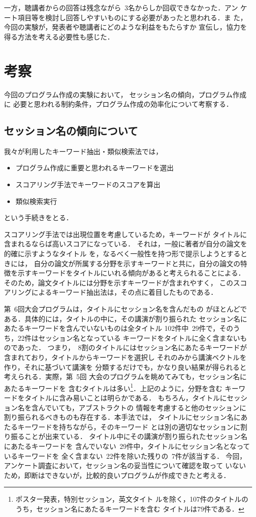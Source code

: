 一方，聴講者からの回答は残念ながら\ 3名からしか回収できなかった．アン
ケート項目等を検討し回答しやすいものにする必要があったと思われる．ま
た，今回の実験が，発表者や聴講者にどのような利益をもたらすか
宣伝し，協力を得る方法を考える必要性も感じた．

\section{考察} 
\label{mumu}
今回のプログラム作成の実験において，
セッション名の傾向，プログラム作成に
必要と思われる制約条件，プログラム作成の効率化について考察する．

\subsection{セッション名の傾向について}
我々が利用したキーワード抽出・類似検索法では，
\begin{itemize}
\item[1] プログラム作成に重要と思われるキーワードを選出
\item[2] スコアリング手法でキーワードのスコアを算出
\item[3] 類似検索実行
\end{itemize}
という手続きをとる．

スコアリング手法では出現位置を考慮しているため，キーワードが
タイトルに含まれるならば高いスコアになっている．
それは，一般に著者が自分の論文を的確に示すようなタイトル
を，なるべく一般性を持つ形で提示しようとするときには，
自分の論文が所属する分野を示すキーワードと共に，自分の論文の特
徴を示すキーワードをタイトルにいれる傾向があると考えられることによる．
そのため，論文タイトルには分野を示すキーワードが含まれやすく，
このスコアリングによるキーワード抽出法は，その点に着目したものである．

第\ 6回大会プログラムは，タイトルにセッション名を含んだもの
がほとんどである．具体的には，タイトルの中に，その講演が割り振られた
セッション名にあたるキーワードを含んでいないものは全タイトル
102件中\ 29件で，そのうち，22件はセッション名となっている
キーワードをタイトルに全く含まないものであった．
つまり，\ 8割のタイトルにはセッション名にあたるキーワードが
含まれており，タイトルからキーワードを選択し
それのみから講演ベクトルを作り，それに基づいて講演を
分類するだけでも，かなり良い結果が得られると考えられる．実際，第\ 5回
大会のプログラムを眺めてみても，セッション名にあたるキーワードを
含むタイトルは多い\footnote{ポスター発表，特別セッション，英文タイト
ルを除く，107件のタイトルのうち，セッション名にあたるキーワードを含む
タイトルは79件である．}．上記のように，分野を含む
キーワードをタイトルに含み易いことは明らかである．
もちろん，タイトルにセッション名を含んでいても，アブストラクトの
情報を考慮すると他のセッションに割り振られるべきものも存在する．本手法では，
タイトルにセッション名にあたるキーワードを持ちながら，そのキーワード
とは別の適切なセッションに割り振ることが出来ている．
タイトル中にその講演が割り振られたセッション名にあたるキーワードを
含んでいない\ 29件中，タイトルにセッション名となっているキーワードを
全く含まない\ 22件を除いた残りの\ 7件が該当する．
今回，アンケート調査において，セッション名の妥当性について確認を取って
いないため，即断はできないが，比較的良いプログラムが作成できたと考える．

